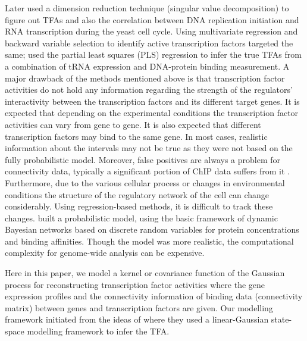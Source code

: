 Later \cite{Alter:2004} used a dimension reduction technique (singular value decomposition) to figure out TFAs and also the correlation between DNA replication initiation and RNA transcription during the yeast cell cycle. Using multivariate regression and backward variable selection to identify active transcription factors \cite{Gao:2004} targeted the same; \cite{Boulesteix:2005} used the partial least squares (PLS) regression to infer the true TFAs from a combination of tRNA expression and DNA-protein binding measurement. A major drawback of the methods mentioned above is that transcription factor activities do not hold any information regarding the strength of the regulators' interactivity between the transcription factors and its different target genes. It is expected that depending on the experimental conditions the transcription factor activities can vary from gene to gene. It is also expected that different transcription factors may bind to the same gene. In most cases, realistic information about the intervals may not be true as they were not based on the fully probabilistic model. Moreover, false positives are always a problem for connectivity data, typically a significant portion of ChIP data suffers from it \cite{Boulesteix:2005}. Furthermore, due to the various cellular process or changes in environmental conditions the structure of the regulatory network of the cell can change considerably. Using regression-based methods, it is difficult to track these changes. \cite{Nachman:2004} built a probabilistic model, using the basic framework of dynamic Bayesian networks based on discrete random variables for protein concentrations and binding affinities. Though the model was more realistic, the computational complexity for genome-wide analysis can be expensive.

Here in this paper, we model a kernel or covariance function of the Gaussian process for reconstructing transcription factor activities where the gene expression profiles and the connectivity information of binding data (connectivity matrix) between genes and transcription factors are given. Our modelling framework initiated from the ideas of \cite{Sanguinetti:2006} where they used a linear-Gaussian state-space modelling framework to infer the TFA. 

